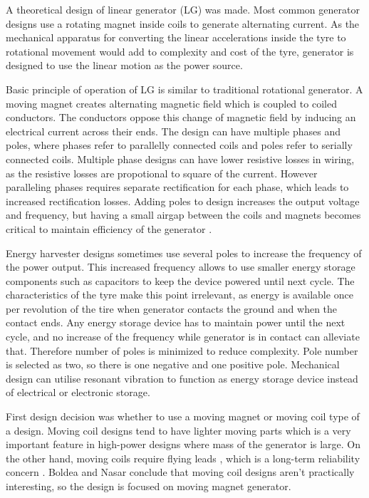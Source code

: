 A theoretical design of linear generator (LG) was made. Most common generator designs use a rotating magnet inside coils to generate alternating current. As the mechanical apparatus for converting the linear accelerations inside the tyre to rotational movement would add to complexity and cost of the tyre, generator is designed to use the linear motion as the power source.

Basic principle of operation of LG is similar to traditional rotational generator. A moving magnet creates alternating magnetic field which is coupled to coiled conductors. The conductors oppose this change of magnetic field by inducing an electrical current across their ends. The design can have multiple phases and poles, where phases refer to parallelly connected coils and poles refer to serially connected coils. Multiple phase designs can have lower resistive losses in wiring, as the resistive losses are propotional to square of the current. However paralleling phases requires separate rectification for each phase, which leads to increased rectification losses. Adding poles to design increases the output voltage and frequency, but having a small airgap between the coils and magnets becomes critical to maintain efficiency of the generator \cite{Cheng2008}. 

Energy harvester designs sometimes use several poles to increase the frequency of the power output. This increased frequency allows to use smaller energy storage components such as capacitors to keep the device powered until next cycle. The characteristics of the tyre make this point irrelevant, as energy is available once per revolution of the tire when generator contacts the ground and when the contact ends. Any energy storage device has to maintain power until the next cycle, and no increase of the frequency while generator is in contact can alleviate that. Therefore number of poles is minimized to reduce complexity. Pole number is selected as two, so there is one negative and one positive pole. Mechanical design can utilise resonant vibration to function as energy storage device instead of electrical or electronic storage.

First design decision was whether to use a moving magnet or moving coil type of a design. Moving coil designs tend to have lighter moving parts which is a very important feature in high-power designs where mass of the generator is large. On the other hand, moving coils require flying leads  \cite{Jacob2011},  which is a long-term reliability concern  \cite{Boldea1999}.  Boldea and Nasar \cite[p. 203]{Boldea1999a} conclude that moving coil designs aren't practically interesting, so the design is focused on moving magnet generator. 

